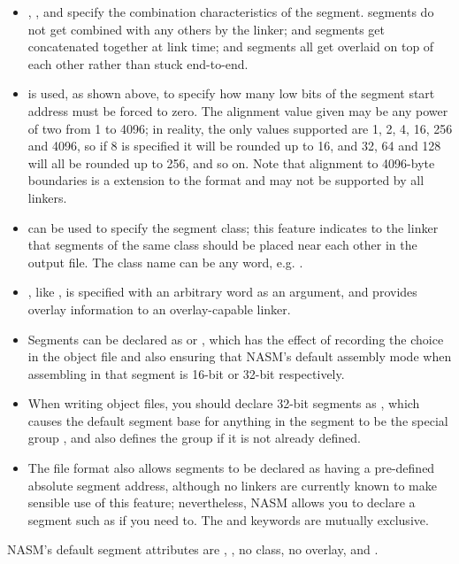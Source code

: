 \begin{itemize}
    \item{, , 
        and  specify the combination characteristics
        of the segment.  segments do not get combined
        with any others by the linker;  and 
        segments get concatenated together at link time; and 
        segments all get overlaid on top of each other rather than stuck
        end-to-end.}

    \item{ is used, as shown above, to specify how many
        low bits of the segment start address must be forced to zero.
        The alignment value given may be any power of two from 1 to 4096;
        in reality, the only values supported are 1, 2, 4, 16, 256 and 4096,
        so if 8 is specified it will be rounded up to 16, and 32, 64 and 128
        will all be rounded up to 256, and so on. Note that alignment to
        4096-byte boundaries is a  extension to the
        format and may not be supported by all linkers.
        }

    \item{ can be used to specify the segment class;
        this feature indicates to the linker that segments of the same
        class should be placed near each other in the output file.
        The class name can be any word, e.g. .}

    \item{, like , is specified with
        an arbitrary word as an argument, and provides overlay information
        to an overlay-capable linker.}

    \item{Segments can be declared as  or ,
        which has the effect of recording the choice in the object file
        and also ensuring that NASM's default assembly mode when assembling
        in that segment is 16-bit or 32-bit respectively.}

    \item{When writing  object files, you should declare
        32-bit segments as , which causes the default
        segment base for anything in the segment to be the special group
        , and also defines the group if it is not already defined.}

    \item{The  file format also allows segments to be declared as
        having a pre-defined absolute segment address, although no linkers
        are currently known to make sensible use of this feature;
        nevertheless, NASM allows you to declare a segment such as
         if you need to. The
         and  keywords are mutually
        exclusive.}
\end{itemize}

NASM's default segment attributes are , , no
class, no overlay, and .
